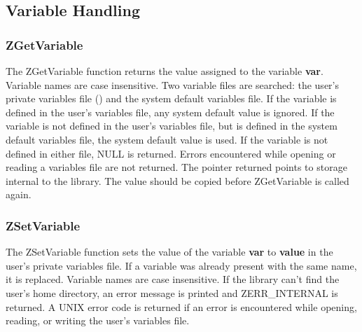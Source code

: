 %
\subsection{Variable Handling}
\label{variables}

\subsubsection{ZGetVariable}
\label{ZGetVariable}

\etemplate
{}

The ZGetVariable function returns the value assigned to the variable
{\bf var}.  Variable names are case insensitive.  Two variable files are
searched: the user's private variables file
()
and the system default variables file.  If the variable
is defined in the user's variables file, any system default value is
ignored.  If the variable is not defined in the user's variables file,
but is defined in the system default variables file, the system default
value is used.  If the variable is not defined in either file, NULL is
returned.  Errors encountered while opening or reading a variables file
are not returned.  The pointer returned points to storage internal to
the library.  The value should be copied before ZGetVariable is called
again.

\subsubsection{ZSetVariable}
\label{ZSetVariable}

\etemplate
{}

The ZSetVariable function sets the value of the variable {\bf var} to
{\bf value} in the user's private variables file.  If a variable was
already present with the same name, it is replaced.  Variable names
are case insensitive.  If the library can't find the user's home
directory, an error message is printed and ZERR_INTERNAL is returned.
A UNIX error code is returned if an error is encountered while opening,
reading, or writing the user's variables file.

